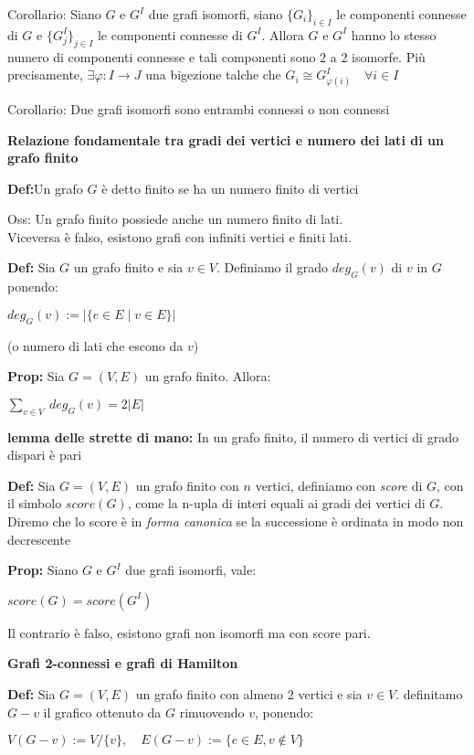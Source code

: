 \documentclass[11pt, letterpaper]{article}
\begin{document}
Corollario: Siano $G$ e $G^{I}$ due grafi isomorfi, siano $\{G_{i}\}_{i\in I}$ le componenti connesse di $G$ e 
$\{G^{I}_{j}\}_{j\in I}$ le componenti connesse di $G^{I}$. Allora $G$ e $G^{I}$ hanno lo stesso numero di componenti
connesse e tali componenti sono 2 a 2 isomorfe. Più precisamente, $\exists\varphi:I\to J$ una bigezione talche che 
$G_{i}\cong G^{I}_{\varphi(i)}\quad\forall i\in I$

Corollario: Due grafi isomorfi sono entrambi connessi o non connessi

\newpage
\textbf{Relazione fondamentale tra gradi dei vertici e numero dei lati di un grafo finito}

\textbf{Def:}Un grafo $G$ è detto finito se ha un numero finito di vertici

Oss: Un grafo finito possiede anche un numero finito di lati.\\Viceversa è falso, esistono grafi con infiniti vertici
e finiti lati.

\textbf{Def:} Sia $G$ un grafo finito e sia $v\in V$. Definiamo il grado $deg_{G}(v)$ di $v$ in $G$ ponendo:
\begin{center}
    $deg_{G}(v):=|\{e\in E\mid v\in E\}|$

    \small{(o numero di lati che escono da $v$)}
\end{center}

\textbf{Prop:} Sia $G=(V,E)$ un grafo finito. Allora:
\begin{center}
    $\sum_{v\in V}\ deg_{G}(v)=2|E|$
\end{center}

\textbf{lemma delle strette di mano:} In un grafo finito, il numero di vertici di grado dispari è pari

\textbf{Def:} Sia $G=(V,E)$ un grafo finito con $n$ vertici, definiamo con \textit{score} di $G$, con il simbolo
$score(G)$, come la n-upla di interi equali ai gradi dei vertici di $G$.\\ Diremo che lo score è in \textit{forma
canonica} se la successione è ordinata in modo non decrescente

\textbf{Prop:} Siano $G$ e $G^{I}$ due grafi isomorfi, vale:
\begin{center}
    $score(G)=score(G^{I})$
\end{center}
Il contrario è falso, esistono grafi non isomorfi ma con score pari.

\textbf{Grafi 2-connessi e grafi di Hamilton}

\textbf{Def:} Sia $G=(V,E)$ un grafo finito con almeno 2 vertici e sia $v\in V$. definitamo $G-v$ il grafico
ottenuto da $G$ rimuovendo $v$, ponendo:
\begin{center}
    $V(G-v):=V/\{v\},\quad E(G-v):=\{e\in E, v\notin V\}$
\end{center}
\end{document}

